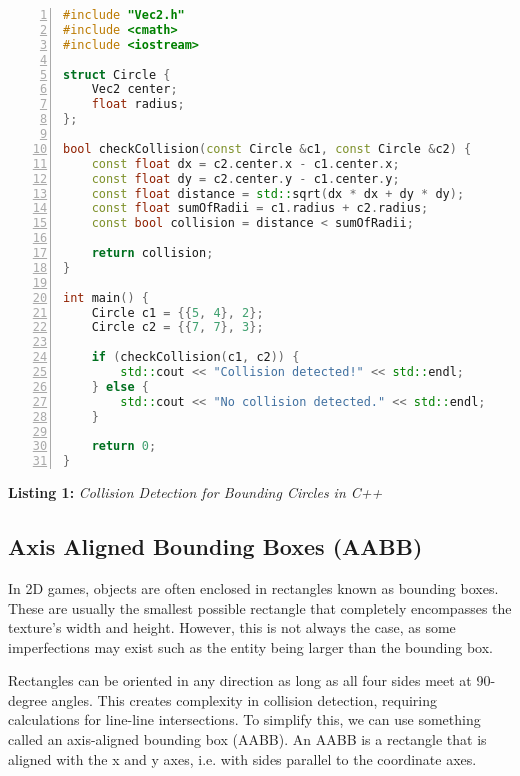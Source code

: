 \documentclass{article}
\begin{document}
\begin{mdframed}[linecolor=black!30!white,linewidth=.5pt,extratopheight=3em]
    \begin{lstlisting}[language=C++, aboveskip=3mm,
        belowskip=3mm,
        showstringspaces=false,
        columns=flexible,
        basicstyle={\small\ttfamily},
        numbers=left,
        numberstyle=\tiny\color{gray},
        keywordstyle=\color{blue},
        commentstyle=\color{dkgreen},
        stringstyle=\color{mauve},
        breaklines=true,
        breakatwhitespace=true,
        tabsize=3,
        xleftmargin=1em]
#include "Vec2.h"
#include <cmath>
#include <iostream>

struct Circle {
    Vec2 center;
    float radius;
};

bool checkCollision(const Circle &c1, const Circle &c2) {
    const float dx = c2.center.x - c1.center.x;
    const float dy = c2.center.y - c1.center.y;
    const float distance = std::sqrt(dx * dx + dy * dy);
    const float sumOfRadii = c1.radius + c2.radius;
    const bool collision = distance < sumOfRadii;

    return collision;
}

int main() {
    Circle c1 = {{5, 4}, 2};
    Circle c2 = {{7, 7}, 3};

    if (checkCollision(c1, c2)) {
        std::cout << "Collision detected!" << std::endl;
    } else {
        std::cout << "No collision detected." << std::endl;
    }

    return 0;
}
\end{lstlisting}

\end{mdframed}

\begin{center}
    \textbf{Listing 1:} \textit{Collision Detection for Bounding Circles in C++}
\end{center}

\newpage

\subsection{Axis Aligned Bounding Boxes (AABB)}
In 2D games, objects are often enclosed in rectangles known as bounding boxes.
These are usually the smallest possible rectangle that completely encompasses
the texture's width and height. However, this is not always the case, as some
imperfections may exist such as the entity being larger than the bounding box.

Rectangles can be oriented in any direction as long as all four sides meet at
90-degree angles. This creates complexity in collision detection, requiring
calculations for line-line intersections. To simplify this, we can use
something called an axis-aligned bounding box (AABB). An AABB is a rectangle
that is aligned with the x and y axes, i.e. with sides parallel to the
coordinate axes.
\end{document}
